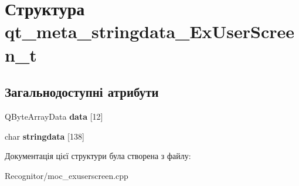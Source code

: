 \hypertarget{structqt__meta__stringdata__ExUserScreen__t}{\section{Структура qt\-\_\-meta\-\_\-stringdata\-\_\-\-Ex\-User\-Screen\-\_\-t}
\label{structqt__meta__stringdata__ExUserScreen__t}
}
\subsection*{Загальнодоступні атрибути}
\begin{DoxyCompactItemize}
\item 
\hypertarget{structqt__meta__stringdata__ExUserScreen__t_a85a59682b5504e781fc2f64b50597d59}{Q\-Byte\-Array\-Data {\bfseries data} \mbox{[}12\mbox{]}}\label{structqt__meta__stringdata__ExUserScreen__t_a85a59682b5504e781fc2f64b50597d59}

\item 
\hypertarget{structqt__meta__stringdata__ExUserScreen__t_a5a72f104d835db06eca6b09b280b10ce}{char {\bfseries stringdata} \mbox{[}138\mbox{]}}\label{structqt__meta__stringdata__ExUserScreen__t_a5a72f104d835db06eca6b09b280b10ce}

\end{DoxyCompactItemize}


Документація цієї структури була створена з файлу\-:\begin{DoxyCompactItemize}
\item 
Recognitor/moc\-\_\-exuserscreen.\-cpp\end{DoxyCompactItemize}
